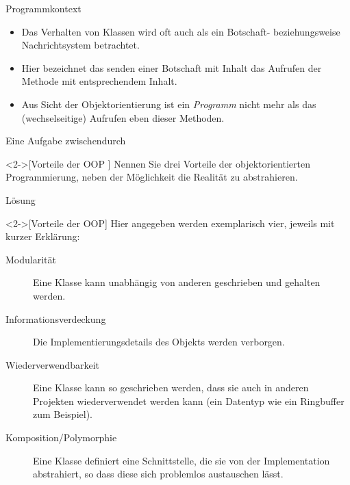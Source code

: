 \begin{frame}{Programmkontext}
    \begin{itemize}[<+(1)->]
        \item Das Verhalten von Klassen wird oft auch als ein Botschaft- beziehungsweise Nachrichtsystem betrachtet.
        \item Hier bezeichnet das senden einer Botschaft\pause{} mit Inhalt das Aufrufen der Methode mit entsprechendem Inhalt.
        \item Aus Sicht der Objektorientierung ist ein \emph{Programm}\pause{} nicht mehr als das (wechselseitige) Aufrufen eben dieser Methoden.
    \end{itemize}
\end{frame}

\ifull
\begin{frame}[c]{Eine Aufgabe zwischendurch}
    \begin{exercise}<2->[Vorteile der OOP ]
        Nennen Sie drei Vorteile der objektorientierten Programmierung,\pause{} neben der Möglichkeit die Realität zu abstrahieren.
    \end{exercise}
\end{frame}

\begin{frame}[c]{Lösung}
    \begin{solve}<2->[Vorteile der OOP]
        Hier angegeben werden exemplarisch vier, jeweils mit kurzer Erklärung:\begin{description}
            \item[Modularität] Eine Klasse kann unabhängig von anderen geschrieben und gehalten werden.
            \item[Informationsverdeckung] Die Implementierungsdetails des Objekts werden verborgen.
            \item[Wiederverwendbarkeit] Eine Klasse kann so geschrieben werden, dass sie auch in anderen Projekten wiederverwendet werden kann\pause{} (ein Datentyp wie ein Ringbuffer zum Beispiel).
            \item[Komposition/Polymorphie] Eine Klasse definiert eine Schnittstelle, die sie von der Implementation abstrahiert,\pause{} so dass diese sich problemlos austauschen lässt.
        \end{description}
    \end{solve}
\end{frame}
\fi

